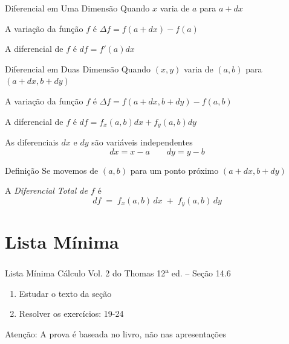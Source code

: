 \documentclass[fleqn,utf8,aspectratio=169,12pt]{beamer}
\begin{document}
\begin{frame}{Diferencial em Uma Dimensão}
  Quando $x$ varia de $a$ para
  \tabto{55mm}\(a+dx\)

  \vspace{\baselineskip}
  A variação da função $f$ é
  \tabto{55mm}\(\Delta f = f(a + dx) - f(a)\)

  \vspace{\baselineskip}
  A diferencial de $f$ é
  \tabto{55mm}\(df = f'(a) dx\)
\end{frame}

\begin{frame}{Diferencial em Duas Dimensão}
  Quando $(x, y)$ varia de $(a, b)$ para
  \tabto{65mm}\((a+dx, b+dy)\)

  \pause
  \vspace{\baselineskip}
  A variação da função $f$ é
  \tabto{65mm}\(\Delta f = f(a+dx, b+dy) - f(a, b)\)

  \pause
  \vspace{\baselineskip}
  A diferencial de $f$ é
  \tabto{65mm}\(df = f_x(a, b) dx +  f_y(a, b) dy\)

  \pause
  \vspace{\baselineskip}
  As diferenciais $dx$ e $dy$ são variáveis independentes
  \[
    dx = x - a
    \qquad
    dy=y-b
  \]
\end{frame}

\begin{frame}{Definição}
  Se movemos de \((a, b)\) para um ponto próximo \((a+dx, b+dy)\)

  \pause
  \vspace{\baselineskip}
  A \emph{Diferencial Total de $f$} é
  \[
    df \;=\; f_x(a, b)\, dx \;+\;  f_y(a, b)\, dy
  \]
\end{frame}



\section{Lista Mínima}

\begin{frame}{Lista Mínima}
  Cálculo Vol. 2 do Thomas 12\textsuperscript{a} ed. -- Seção 14.6
  \begin{enumerate}
    \item Estudar o texto da seção
    \item Resolver os exercícios: 19-24
  \end{enumerate}

  \vfill
  Atenção: A prova é baseada no livro, não nas apresentações
\end{frame}

\end{document}
